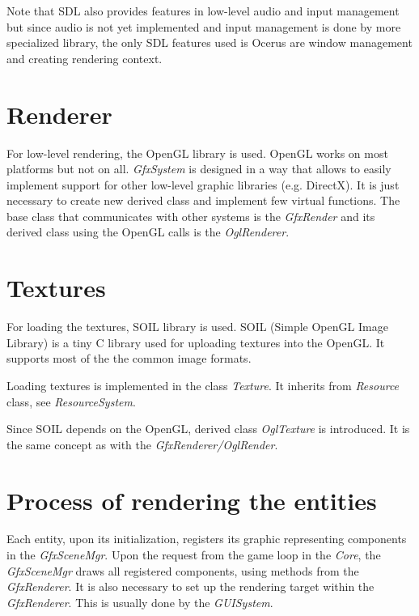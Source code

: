 Note that SDL also provides features in low-level audio and input management but since audio is not yet implemented and input management is done by more specialized library, the only SDL features used is Ocerus are window management and creating rendering context.

\section{Renderer}
For low-level rendering, the OpenGL library is used. OpenGL works on most platforms but not on all. \emph{GfxSystem} is designed in a way that allows to easily implement support for other low-level graphic libraries (e.g. DirectX). It is just necessary to create new derived class and implement few virtual functions. The base class that communicates with other systems is the \emph{GfxRender} and its derived class using the OpenGL calls is the \emph{OglRenderer}.

\section{Textures}
For loading the textures, SOIL library is used.
SOIL (Simple OpenGL Image Library) is a tiny C library used for uploading textures into the OpenGL. It supports most of the the common image formats.

Loading textures is implemented in the class \emph{Texture}. It inherits from  \emph{Resource} class, see \emph{ResourceSystem}. 

Since SOIL depends on the OpenGL, derived class \emph{OglTexture} is introduced. It is the same concept as with the \emph{GfxRenderer/OglRender}.
 
\section{Process of rendering the entities}
Each entity, upon its initialization, registers its graphic representing components in the \emph{GfxSceneMgr}. Upon the request from the game loop in the \emph{Core}, the \emph{GfxSceneMgr} draws all registered components, using methods from the  \emph{GfxRenderer}. It is also necessary to set up the rendering target within the \emph{GfxRenderer}. This is usually done by the \emph{GUISystem}.


%


